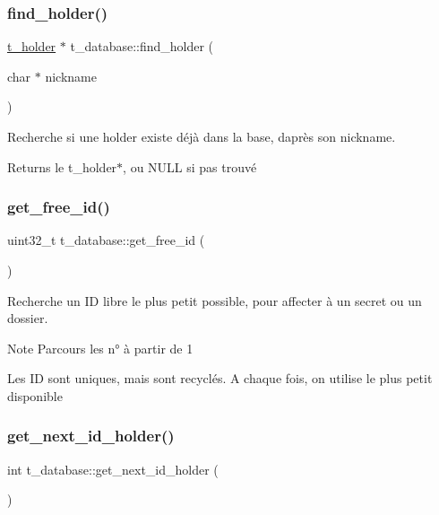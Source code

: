\subsubsection{\texorpdfstring{find\+\_\+holder()}{find\_holder()}}
{\footnotesize\ttfamily \hyperlink{classt__holder}{t\+\_\+holder} $\ast$ t\+\_\+database\+::find\+\_\+holder (\begin{DoxyParamCaption}\item[{char $\ast$}]{nickname }\end{DoxyParamCaption})}



Recherche si une holder existe déjà dans la base, d\textquotesingle{}après son nickname. 

\begin{DoxyReturn}{Returns}
le t\+\_\+holder$\ast$, ou N\+U\+LL si pas trouvé 
\end{DoxyReturn}
\mbox{\label{classt__database_a093ddfc300f1f065f25447d41373d6a4}} 
\subsubsection{\texorpdfstring{get\+\_\+free\+\_\+id()}{get\_free\_id()}}
{\footnotesize\ttfamily uint32\+\_\+t t\+\_\+database\+::get\+\_\+free\+\_\+id (\begin{DoxyParamCaption}{ }\end{DoxyParamCaption})}



Recherche un ID libre le plus petit possible, pour affecter à un secret ou un dossier. 

\begin{DoxyNote}{Note}
Parcours les n° à partir de 1 

Les ID sont uniques, mais sont recyclés. A chaque fois, on utilise le plus petit disponible 
\end{DoxyNote}
\mbox{\label{classt__database_a7cde073935f0fac8d91550dd59b73370}} 
\subsubsection{\texorpdfstring{get\+\_\+next\+\_\+id\+\_\+holder()}{get\_next\_id\_holder()}}
{\footnotesize\ttfamily int t\+\_\+database\+::get\+\_\+next\+\_\+id\+\_\+holder (\begin{DoxyParamCaption}{ }\end{DoxyParamCaption})}



